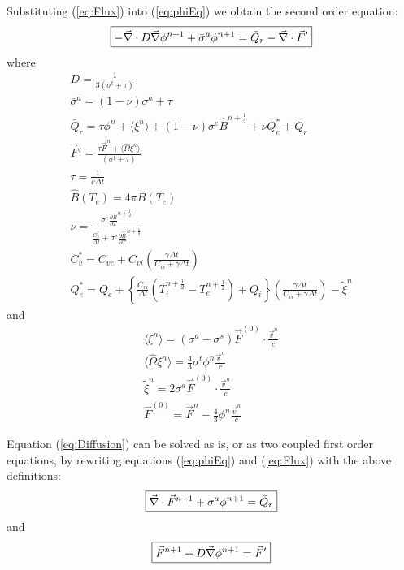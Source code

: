 \documentclass[12pt]{article}
\newcommand{\dt}{\ensuremath{\Delta t}}
\newcommand{\cviOdt}{\ensuremath{\frac{C_{vi}}{\dt}}}
\newcommand{\Cvs}{\ensuremath{C_{v}^{*}}}
\newcommand{\Bnphlf}{\ensuremath{\hat{B}^{n+\frac{1}{2}}}}
\newcommand{\pBnphlfdT}{\ensuremath{\frac{\partial\hat{B}}{\partial T}^{n+\frac{1}{2}}}}
\begin{document}
Substituting (\ref{eq:Flux}) into (\ref{eq:phiEq}) we obtain
the second order equation:
\begin{equation}
   \boxed{
         - \vec{\nabla} \cdot D \vec{\nabla} \phi^{n+1} +  \bar{\sigma}^{a} \phi^{n+1}
                = \bar{Q}_{r} - \vec{\nabla} \cdot \vec{F}'
         }
\label{eq:Diffusion}
\end{equation}
where
\begin{gather}
        D = \frac{1}{3(\sigma^{t} + \tau) } 
  \label{eq:quant_i}
  \\
        \bar{\sigma}^{a} = (1 - \nu) \sigma^{a} + \tau 
  \\
        \bar{Q}_{r} =\tau \phi^{n}
                + \langle \xi^{n} \rangle
                + (1 - \nu) \sigma^{e} \Bnphlf  + \nu Q_{e}^{*} + Q_{r}
  \\
        \vec{F}' = \frac{\tau \vec{F}^{n}
                        + \langle \hat{\Omega} \xi^{n} \rangle}
               {(\sigma^{t} + \tau)}
  \\
        \tau = \frac{1}{c\dt}
  \\
        \hat{B}(T_{e}) = 4\pi B(T_{e})
  \\
        \nu = \frac{\sigma^{e} \pBnphlfdT } {\frac{\Cvs}{\dt} + \sigma^{e}\pBnphlfdT}
  \\
        \Cvs = C_{ve} + C_{vi} \left(\frac{\gamma\dt}{C_{vi}+\gamma\dt}\right)
  \\
        Q_{e}^{*} = Q_{e} + \left\{ \cviOdt (T_{i}^{n+\frac{1}{2}} - T_{e}^{n+\frac{1}{2}}) +
                                Q_{i} \right\}
                \left(\frac{\gamma\dt}{C_{vi}+\gamma\dt}\right) -
                \tilde{\xi}^{n}
\end{gather}
and
\begin{gather}
        \langle \xi^{n} \rangle =
                        (\sigma^{a} - \sigma^{s}) \vec{F}^{(0)}
                        \cdot \frac{\vec{v}^{n}}{c}
  \\
        \langle \hat{\Omega} \xi^{n} \rangle =
                \frac{4}{3} \sigma^{t} \phi^{n} \frac{\vec{v}^{n}}{c}
  \\
        \tilde{\xi}^{n} = 2 \sigma^{a} \vec{F}^{(0)} \cdot
                                \frac{\vec{v}^{n}}{c}
  \\
        \vec{F}^{(0)} = \vec{F}^{n} - \frac{4}{3} \phi^{n}
                                                \frac{\vec{v}^{n}}{c}
  \label{eq:quant_f}
\end{gather}

Equation (\ref{eq:Diffusion}) can be solved as is,
or as two coupled first order equations,
by rewriting equations (\ref{eq:phiEq}) and (\ref{eq:Flux}) with the above
definitions:
\begin{equation}
   \boxed{
        \vec{\nabla} \cdot \vec{F}^{n+1} + \bar{\sigma}^{a} \phi^{n+1}
                = \bar{Q}_{r}
         }
\label{eq:phi2}
\end{equation}
and
\begin{equation}
   \boxed{
        \vec{F}^{n+1} + D \vec{\nabla} \phi^{n+1} =  \vec{F}'
         }
\label{eq:Flux2}
\end{equation}
\end{document}
